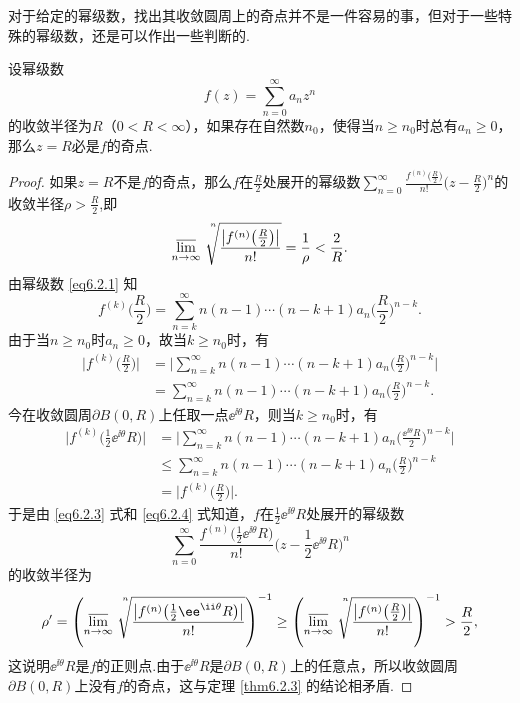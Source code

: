 对于给定的幂级数，找出其收敛圆周上的奇点并不是一件容易的事，但对于一些特殊的幂级数，还是可以作出一些判断的.

\begin{prop}\label{prop6.2.4}
设幂级数
\[f(z)=\sum_{n=0}^\infty a_nz^n\]
的收敛半径为$R$（$0<R<\infty$），如果存在自然数$n_0$，使得当$n\ge n_0$时总有$a_n\ge0$，那么$z=R$必是$f$的奇点.
\end{prop}
\begin{proof}
如果$z=R$不是$f$的奇点，那么$f$在$\frac R2$处展开的幂级数$\sum_{n=0}^\infty
\frac{f^{(n)}\big(\frac R2\big)}{n!}\bigg(z-\frac R2\bigg)^n$的收敛半径$\rho>\frac R2$,即
\begin{equation}\label{eq6.2.3}
\varlimsup_{n\to\infty}\sqrt[\leftroot{-4}\uproot{20}n]{
\frac{\big|f^{(n)}\big(\frac R2\big)\big|}{n!}}=\frac1\rho<\frac2R.
\end{equation}
由幂级数 \eqref{eq6.2.1} 知
\[f^{(k)}\bigg(\frac R2\bigg)=\sum_{n=k}^\infty n(n-1)\cdots(n-k+1)a_n
\bigg(\frac R2\bigg)^{n-k}.\]
由于当$n\ge n_0$时$a_n\ge0$，故当$k\ge n_0$时，有
\begin{align*}
\bigg|f^{(k)}\bigg(\frac R2\bigg)\bigg|
&=\bigg|\sum_{n=k}^\infty n(n-1)\cdots(n-k+1)a_n\bigg(\frac R2\bigg)^{n-k}\bigg|\\
&=\sum_{n=k}^\infty n(n-1)\cdots(n-k+1)a_n\bigg(\frac R2\bigg)^{n-k}.
\end{align*}
今在收敛圆周$\partial B(0,R)$上任取一点$\ee^{\ii\theta}R$，则当$k\ge n_0$时，有
\begin{equation}\label{eq6.2.4}
\begin{aligned}
\bigg|f^{(k)}\bigg(\frac12\ee^{\ii\theta}R\bigg)\bigg|
&=\bigg|\sum_{n=k}^\infty n(n-1)\cdots(n-k+1)a_n\bigg(\frac {\ee^{\ii\theta}R}2\bigg)^{n-k}\bigg|\\
&\le \sum_{n=k}^\infty n(n-1)\cdots(n-k+1)a_n\bigg(\frac R2\bigg)^{n-k}\\
&=\bigg|f^{(k)}\bigg(\frac R2\bigg)\bigg|.
\end{aligned}
\end{equation}
于是由 \eqref{eq6.2.3} 式和 \eqref{eq6.2.4} 式知道，$f$在$\frac12\ee^{\ii\theta}R$处展开的幂级数
\[\sum_{n=0}^\infty\frac{f^{(n)}\big(\frac12\ee^{\ii\theta}R\big)}{n!}
\bigg(z-\frac12\ee^{\ii\theta}R\bigg)^n\]
的收敛半径为
\[\rho'=\left(\varlimsup_{n\to\infty}
\sqrt[\leftroot{-4}\uproot{20}n]{
\frac{\big|f^{(n)}\big(\frac 12\ee^{\ii\theta}R\big)\big|}{n!}}\right)^{-1}
\ge\left(\varlimsup_{n\to\infty}\sqrt[\leftroot{-4}\uproot{20}n]{
\frac{\big|f^{(n)}\big(\frac R2\big)\big|}{n!}}\right)^{-1}
>\frac R2,\]
这说明$\ee^{\ii\theta}R$是$f$的正则点.由于$\ee^{\ii\theta}R$是$\partial B(0,R)$上的任意点，所以收敛圆周$\partial B(0,R)$上没有$f$的奇点，这与定理 \ref{thm6.2.3} 的结论相矛盾.
\end{proof}

